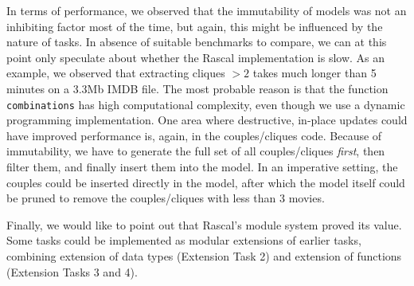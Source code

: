 \documentclass[submission,copyright,creativecommons]{eptcs}
\begin{document}
In terms of performance, we observed that the immutability of models was not an inhibiting factor most of the time, but again, this might be influenced by the nature of tasks. In absence of suitable benchmarks to compare, we can at this point only speculate about whether the Rascal implementation is slow. 
As an example, we observed that  extracting cliques $> 2$ takes much longer than 5 minutes on a
3.3Mb IMDB file.  The most probable reason is that
the function \texttt{combinations} has high computational complexity, even though we use a dynamic programming implementation.
One area where destructive, in-place updates could have improved performance is, again, in the couples/cliques code. Because of immutability, we have to generate the full set of all couples/cliques \textit{first}, then filter them, and finally insert them into the model. 
In an imperative setting, the couples could be inserted directly in the model, after which the model itself could be pruned to remove the couples/cliques with less than 3 movies. 


Finally, we would like to point out that Rascal's module system proved
its value. Some tasks could be implemented as modular extensions of
earlier tasks, combining extension of data types (Extension Task 2)
and extension of functions (Extension Tasks 3 and 4).



\end{document}
